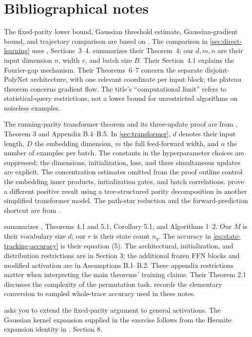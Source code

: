 \documentclass[11pt,twoside]{article}
\theoremstyle{definition}
\theoremstyle{remark}
\begin{document}
\section*{Bibliographical notes}

The fixed-parity lower bound, Gaussian threshold estimate, Gaussian-gradient
bound, and trajectory comparison are based on \citet{shoshani2025}. The
comparison in \cref{sec:direct-learning} uses \citet{barak2022}, Sections~3--4.
 summarizes their Theorem~4; our $d,m,n$
are their input dimension $n$, width $r$, and batch size $B$. Their
Section~4.1 explains the Fourier-gap mechanism. Their Theorems~6--7 concern
the separate disjoint-PolyNet architecture, with one relevant coordinate per
input block; the plateau theorem concerns gradient flow. The title's
``computational limit'' refers to statistical-query restrictions, not a
lower bound for unrestricted algorithms on noiseless examples.

The running-parity transformer theorem and its three-update proof are from
\citet{wen2025}, Theorem 3 and Appendix B.4--B.5. In
\cref{sec:transformer}, $d$ denotes their input length, $D$ the embedding
dimension, $m$ the full feed-forward width, and $n$ the number of examples
per batch. The constants in the hyperparameter choices are suppressed; the
dimensions, initialization, loss, and three simultaneous updates are explicit.
The concentration estimates omitted from the proof outline control the
embedding inner products, initialization gates, and batch correlations.
\citet{kim2025} prove a different positive result using a
tree-structured parity decomposition in another simplified transformer model.
The path-star reduction and the forward-prediction shortcut are from
\citet{hu2025}.

 summarizes \citet{huang2025}, Theorems 4.1 and
5.1, Corollary 5.1, and Algorithms 1--2. Our $M$ is their vocabulary size
$d$; our $r$ is their state count $n_y$. The accuracy in
\cref{eq:state-tracking-accuracy} is their equation (5). The architectural,
initialization, and distribution restrictions are in Section 3; the
additional frozen FFN blocks and modified activation are in Assumptions
B.1--B.2. These appendix restrictions matter when interpreting the main
theorems' training claims. Their Theorem 2.1 discusses the complexity
of the permutation task.  records the
elementary conversion to sampled whole-trace accuracy used in these notes.

 asks you to extend the fixed-parity
argument to general activations. The Gaussian kernel expansion
supplied in the exercise follows from the Hermite expansion identity in
\citet{daniely2016}, Section 8.
\end{document}

